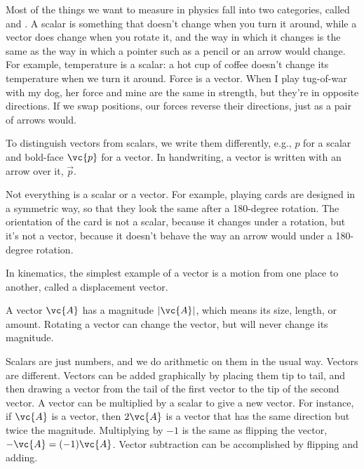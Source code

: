 Most of the things we want to measure in physics fall into two categories,
called  and .
A scalar is something
that doesn't change when you turn it around, while a vector does change
when you rotate it, and the way in which it changes is the same as the way
in which a pointer such as a pencil or an arrow would change. For example,
temperature is a scalar: a hot cup of coffee doesn't change its temperature
when we turn it around. Force is a vector. When I play tug-of-war with my dog,
her force and mine are the same in strength, but they're in opposite directions.
If we swap positions, our forces reverse their directions, just as a pair of arrows would.


To distinguish vectors from scalars, we write them differently, e.g., $p$ for a scalar
and bold-face $\vc{p}$ for a vector. In handwriting, a vector is written with an arrow
over it, $\overrightarrow{p}$.

Not everything is a scalar or a vector. For example, playing cards are designed
in a symmetric way, so that they look the same after a 180-degree rotation.
The orientation of the card is not a scalar, because it changes under a rotation,
but it's not a vector, because it doesn't behave the way an arrow would under a
180-degree rotation.

In kinematics, the simplest example of a vector is a motion from one place to another,
called a displacement vector.

A vector $\vc{A}$ has a magnitude $|\vc{A}|$, which means its size, length, or amount. Rotating a vector
can change the vector, but will never change its magnitude.

Scalars are just numbers, and we do arithmetic on them in the usual
way. Vectors are different. Vectors can be added graphically by placing them tip to tail,
and then drawing a vector from the tail of the first vector to the tip
of the second vector. A vector can be multiplied by a scalar to give a new
vector. For instance, if $\vc{A}$ is a vector, then $2\vc{A}$ is a vector
that has the same direction but twice the magnitude. Multiplying by $-1$ is
the same as flipping the vector, $-\vc{A}=(-1)\vc{A}$. Vector subtraction can be
accomplished by flipping and adding.


